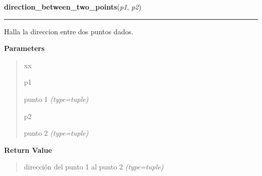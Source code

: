 \hspace{.8\funcindent}\begin{boxedminipage}{\funcwidth}

    \raggedright \textbf{direction\_between\_two\_points}(\textit{p1}, \textit{p2})

    \vspace{-1.5ex}

    \rule{\textwidth}{0.5\fboxrule}
\setlength{\parskip}{2ex}
Halla la direccion entre dos puntos dados.

\setlength{\parskip}{1ex}
      \textbf{Parameters}
      \vspace{-1ex}

      \begin{quote}
        \begin{Ventry}{xx}

          \item[p1]


punto 1
            {\it (type=tuple)}

          \item[p2]


punto 2
            {\it (type=tuple)}

        \end{Ventry}

      \end{quote}

      \textbf{Return Value}
    \vspace{-1ex}

      \begin{quote}

dirección del punto 1 al punto 2
      {\it (type=tuple)}

      \end{quote}

    \end{boxedminipage}

    \label{src:functions:get_max_edge}

    \vspace{0.5ex}

